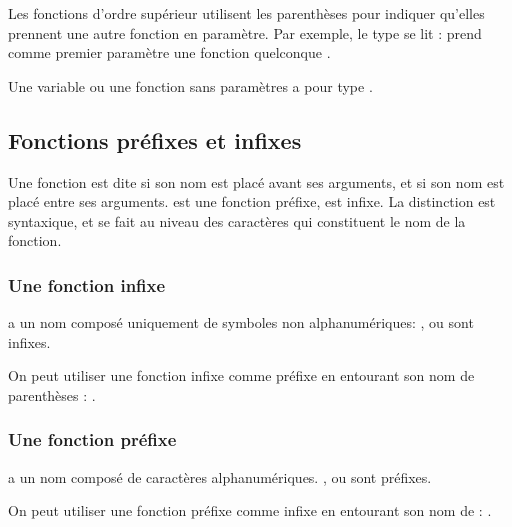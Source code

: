 Les fonctions d'ordre supérieur utilisent les parenthèses pour indiquer qu'elles prennent une autre fonction en paramètre. Par exemple, le type  se lit :  prend comme premier paramètre une fonction quelconque .

Une variable ou une fonction sans paramètres a pour type .

\subsection{Fonctions préfixes et infixes}
\label{infix-functions}
\label{prefix-functions}

Une fonction est dite  si son nom est placé avant ses arguments, et  si son nom est placé entre ses arguments.  est une fonction préfixe, \hsFn{+} est infixe. La distinction est syntaxique, et se fait au niveau des caractères qui constituent le nom de la fonction.

\subsubsection[Fonctions infixes]{Une fonction infixe} a un nom composé uniquement de symboles non alphanumériques: \hsFn{+}, \hsFn{*} ou \hsFn{>>=} sont infixes.

On peut utiliser une fonction infixe comme préfixe en entourant son nom de parenthèses : .

\subsubsection[Fonctions préfixes]{Une fonction préfixe} a un nom composé
de caractères alphanumériques. ,  ou  sont préfixes.

On peut utiliser une fonction préfixe comme infixe en entourant son nom de : .
